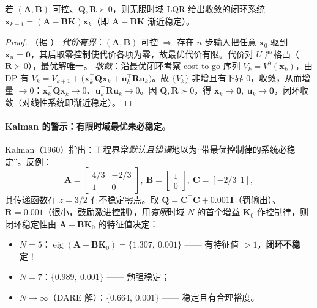 \begin{theorem}
\label{thm:ctrl-lqr-converge}
若 $(\mathbf{A},\mathbf{B})$ 可控、$\mathbf{Q},\mathbf{R}\succ0$，则无限时域 LQR 给出收敛的闭环系统 $\mathbf{x}_{k+1}=(\mathbf{A}-\mathbf{B}\mathbf{K})\mathbf{x}_k$（即 $\mathbf{A}-\mathbf{B}\mathbf{K}$ 渐近稳定）\cite{rawlings2020mpc}。
\end{theorem}
\begin{proof}（据 \cite{rawlings2020mpc}）
\emph{代价有界}：$(\mathbf{A},\mathbf{B})$ 可控 $\Rightarrow$ 存在 $n$ 步输入把任意 $\mathbf{x}_0$ 驱到 $\mathbf{x}_n=\mathbf{0}$，其后取零控制使代价各项为零，故最优代价有限。代价对 $U$ 严格凸（$\mathbf{R}\succ0$），最优解唯一。
\emph{收敛}：沿最优闭环考察 cost-to-go 序列 $V_k=V^0(\mathbf{x}_k)$，由 DP 有 $V_k=V_{k+1}+\big(\mathbf{x}_k^\top\mathbf{Q}\mathbf{x}_k+\mathbf{u}_k^\top\mathbf{R}\mathbf{u}_k\big)$。故 $\{V_k\}$ 非增且有下界 0，收敛，从而增量 $\to0$：$\mathbf{x}_k^\top\mathbf{Q}\mathbf{x}_k\to0$、$\mathbf{u}_k^\top\mathbf{R}\mathbf{u}_k\to0$。因 $\mathbf{Q},\mathbf{R}\succ0$，得 $\mathbf{x}_k\to\mathbf{0},\ \mathbf{u}_k\to\mathbf{0}$，闭环收敛（对线性系统即渐近稳定）。
\end{proof}


\paragraph{Kalman 的警示：有限时域最优未必稳定。}
\begin{example}[Kalman 反例：最优 $\ne$ 稳定]
\label{ex:ctrl-kalman}
 Kalman（1960）指出：工程界常\emph{默认且错误}地以为“带最优控制律的系统必稳定”。反例：
\[
  \mathbf{A}=\begin{bmatrix}4/3&-2/3\\1&0\end{bmatrix},\ \mathbf{B}=\begin{bmatrix}1\\0\end{bmatrix},\ \mathbf{C}=[-2/3\ \ 1],
\]
其传递函数在 $z=3/2$ 有不稳定零点。取 $\mathbf{Q}=\mathbf{C}^\top\mathbf{C}+0.001\mathbf{I}$（罚输出）、$\mathbf{R}=0.001$（很小，鼓励激进控制），用\emph{有限}时域 $N$ 的首个增益 $\mathbf{K}_0$ 作控制律，则闭环稳定性由 $\mathbf{A}-\mathbf{B}\mathbf{K}_0$ 的特征值决定：
\begin{itemize}
  \item $N=5$：$\operatorname{eig}(\mathbf{A}-\mathbf{B}\mathbf{K}_0)=\{1.307,\ 0.001\}$ —— 有特征值 $>1$，\textbf{闭环不稳定}！
  \item $N=7$：$\{0.989,\ 0.001\}$ —— 勉强稳定；
  \item $N\to\infty$（DARE 解）：$\{0.664,\ 0.001\}$ —— 稳定且有合理裕度。
\end{itemize}
\end{example}

